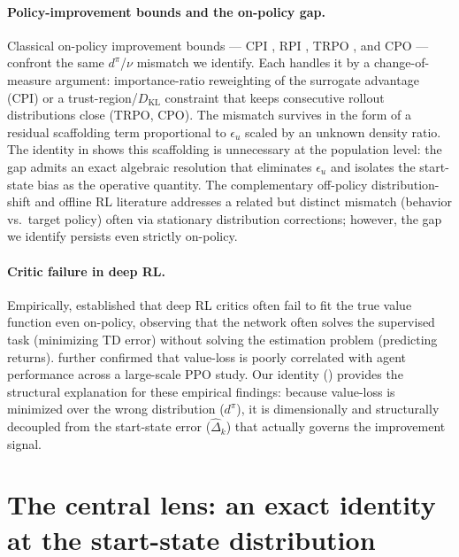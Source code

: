 \documentclass{article}
\begin{document}
\paragraph{Policy-improvement bounds and the on-policy gap.}
Classical on-policy improvement bounds --- CPI \citep{kakade2002approximately}, RPI \citep{pirotta2013relative}, TRPO \citep{schulman2015trust}, and CPO \citep{achiam2017constrained} --- confront the same $d^\pi$/$\nu$ mismatch we identify. Each handles it by a change-of-measure argument: importance-ratio reweighting of the surrogate advantage (CPI) or a trust-region/$D_{\mathrm{KL}}$ constraint that keeps consecutive rollout distributions close (TRPO, CPO). The mismatch survives in the form of a residual scaffolding term proportional to $\epsilon_u$ scaled by an unknown density ratio. The identity in  shows this scaffolding is unnecessary at the population level: the gap admits an exact algebraic resolution that eliminates $\epsilon_u$ and isolates the start-state bias as the operative quantity. The complementary off-policy distribution-shift and offline RL literature \citep{islam2019off, nachum2019dualdice, voloshin2021empirical, prudencio2023survey} addresses a related but distinct mismatch (behavior vs.\ target policy) often via stationary distribution corrections; however, the gap we identify persists even strictly on-policy. 

\paragraph{Critic failure in deep RL.}
Empirically, \citet{ilyas2020closer} established that deep RL critics often fail to fit the true value function even on-policy, observing that the network often solves the supervised task (minimizing TD error) without solving the estimation problem (predicting returns). \citet{andrychowicz2021what} further confirmed that value-loss is poorly correlated with agent performance across a large-scale PPO study. Our identity () provides the structural explanation for these empirical findings: because value-loss is minimized over the wrong distribution ($d^\pi$), it is dimensionally and structurally decoupled from the start-state error ($\hat\Delta_k$) that actually governs the improvement signal.


\section{The central lens: an exact identity at the start-state distribution}
\label{sec:setup}
\end{document}

